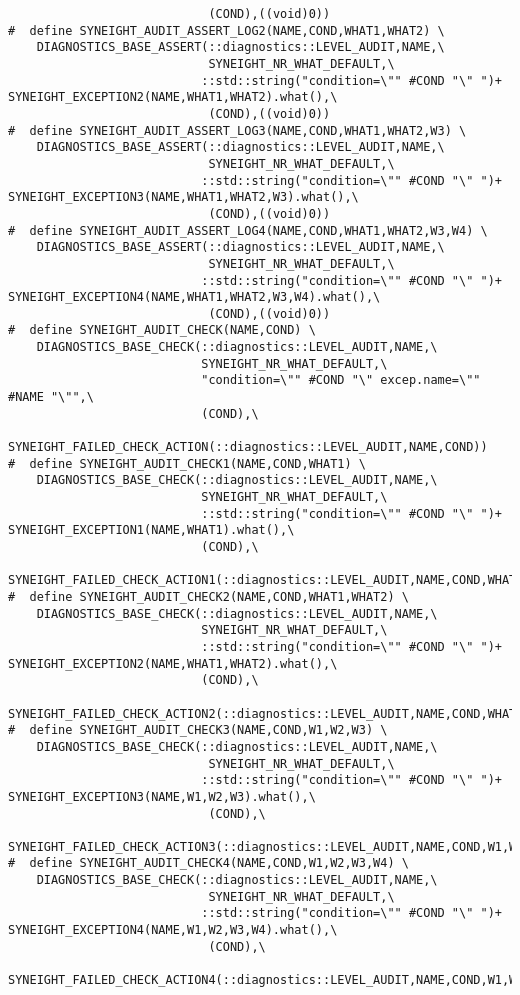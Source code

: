 \begin{verbatim}
                            (COND),((void)0))
#  define SYNEIGHT_AUDIT_ASSERT_LOG2(NAME,COND,WHAT1,WHAT2) \
    DIAGNOSTICS_BASE_ASSERT(::diagnostics::LEVEL_AUDIT,NAME,\
                            SYNEIGHT_NR_WHAT_DEFAULT,\
                           ::std::string("condition=\"" #COND "\" ")+ SYNEIGHT_EXCEPTION2(NAME,WHAT1,WHAT2).what(),\
                            (COND),((void)0))
#  define SYNEIGHT_AUDIT_ASSERT_LOG3(NAME,COND,WHAT1,WHAT2,W3) \
    DIAGNOSTICS_BASE_ASSERT(::diagnostics::LEVEL_AUDIT,NAME,\
                            SYNEIGHT_NR_WHAT_DEFAULT,\
                           ::std::string("condition=\"" #COND "\" ")+ SYNEIGHT_EXCEPTION3(NAME,WHAT1,WHAT2,W3).what(),\
                            (COND),((void)0))
#  define SYNEIGHT_AUDIT_ASSERT_LOG4(NAME,COND,WHAT1,WHAT2,W3,W4) \
    DIAGNOSTICS_BASE_ASSERT(::diagnostics::LEVEL_AUDIT,NAME,\
                            SYNEIGHT_NR_WHAT_DEFAULT,\
                           ::std::string("condition=\"" #COND "\" ")+ SYNEIGHT_EXCEPTION4(NAME,WHAT1,WHAT2,W3,W4).what(),\
                            (COND),((void)0))
#  define SYNEIGHT_AUDIT_CHECK(NAME,COND) \
    DIAGNOSTICS_BASE_CHECK(::diagnostics::LEVEL_AUDIT,NAME,\
                           SYNEIGHT_NR_WHAT_DEFAULT,\
                           "condition=\"" #COND "\" excep.name=\"" #NAME "\"",\
                           (COND),\
                           SYNEIGHT_FAILED_CHECK_ACTION(::diagnostics::LEVEL_AUDIT,NAME,COND))
#  define SYNEIGHT_AUDIT_CHECK1(NAME,COND,WHAT1) \
    DIAGNOSTICS_BASE_CHECK(::diagnostics::LEVEL_AUDIT,NAME,\
                           SYNEIGHT_NR_WHAT_DEFAULT,\
                           ::std::string("condition=\"" #COND "\" ")+ SYNEIGHT_EXCEPTION1(NAME,WHAT1).what(),\
                           (COND),\
                           SYNEIGHT_FAILED_CHECK_ACTION1(::diagnostics::LEVEL_AUDIT,NAME,COND,WHAT1))
#  define SYNEIGHT_AUDIT_CHECK2(NAME,COND,WHAT1,WHAT2) \
    DIAGNOSTICS_BASE_CHECK(::diagnostics::LEVEL_AUDIT,NAME,\
                           SYNEIGHT_NR_WHAT_DEFAULT,\
                           ::std::string("condition=\"" #COND "\" ")+ SYNEIGHT_EXCEPTION2(NAME,WHAT1,WHAT2).what(),\
                           (COND),\
                           SYNEIGHT_FAILED_CHECK_ACTION2(::diagnostics::LEVEL_AUDIT,NAME,COND,WHAT1,WHAT2))
#  define SYNEIGHT_AUDIT_CHECK3(NAME,COND,W1,W2,W3) \
    DIAGNOSTICS_BASE_CHECK(::diagnostics::LEVEL_AUDIT,NAME,\
                            SYNEIGHT_NR_WHAT_DEFAULT,\
                           ::std::string("condition=\"" #COND "\" ")+ SYNEIGHT_EXCEPTION3(NAME,W1,W2,W3).what(),\
                            (COND),\
                            SYNEIGHT_FAILED_CHECK_ACTION3(::diagnostics::LEVEL_AUDIT,NAME,COND,W1,W2,W3))
#  define SYNEIGHT_AUDIT_CHECK4(NAME,COND,W1,W2,W3,W4) \
    DIAGNOSTICS_BASE_CHECK(::diagnostics::LEVEL_AUDIT,NAME,\
                            SYNEIGHT_NR_WHAT_DEFAULT,\
                           ::std::string("condition=\"" #COND "\" ")+ SYNEIGHT_EXCEPTION4(NAME,W1,W2,W3,W4).what(),\
                            (COND),\
                            SYNEIGHT_FAILED_CHECK_ACTION4(::diagnostics::LEVEL_AUDIT,NAME,COND,W1,W2,W3,W4))


\end{verbatim}

